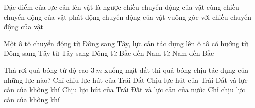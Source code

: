 \begin{ex}%
Đặc điểm của lực cản lên vật là
\choice
{\True ngược chiều chuyển động của vật}
{cùng chiều chuyển động của vật}
{phát động chuyển động của vật}
{vuông góc với chiều chuyển động của vật}
\loigiai{}
 \end{ex}
\begin{ex}%
Một ô tô chuyển động từ Đông sang Tây, lực cản tác dụng lên ô tô có hướng
\choice
{từ Đông sang Tây}
{\True từ Tây sang Đông}
{từ Bắc đến Nam}
{từ Nam đến Bắc}
\loigiai{}
 \end{ex}

\begin{ex}%
Thả rơi quả bóng từ độ cao $3\ m$ xuống mặt đất thì quả bóng chịu tác dụng của những lực nào?
\choice
{Chỉ chịu lực hút của Trái Đất}
{\True Chịu lực hút của Trái Đất và lực cản của không khí}
{Chịu lực hút của Trái Đất và lực cản của nước}
{Chỉ chịu lực cản của không khí}
\loigiai{}
 \end{ex}

